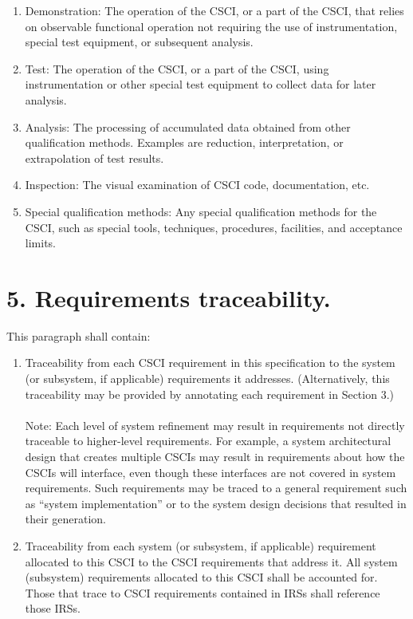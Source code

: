 \begin{enumerate}
\itemsep1pt\parskip0pt
\item
  Demonstration: The operation of the CSCI, or a part of the CSCI, that
  relies on observable functional operation not requiring the use of
  instrumentation, special test equipment, or subsequent analysis.
\item
  Test: The operation of the CSCI, or a part of the CSCI, using
  instrumentation or other special test equipment to collect data for
  later analysis.
\item
  Analysis: The processing of accumulated data obtained from other
  qualification methods. Examples are reduction, interpretation, or
  extrapolation of test results.
\item
  Inspection: The visual examination of CSCI code, documentation, etc.
\item
  Special qualification methods: Any special qualification methods for
  the CSCI, such as special tools, techniques, procedures, facilities,
  and acceptance limits.
\end{enumerate}

\section{5. Requirements traceability.}

This paragraph shall contain:

\begin{enumerate}
\itemsep1pt\parskip0pt
\item
  Traceability from each CSCI requirement in this specification to the
  system (or subsystem, if applicable) requirements it addresses.
  (Alternatively, this traceability may be provided by annotating each
  requirement in Section 3.) \\\\ Note: Each level of system refinement
  may result in requirements not directly traceable to higher-level
  requirements. For example, a system architectural design that creates
  multiple CSCIs may result in requirements about how the CSCIs will
  interface, even though these interfaces are not covered in system
  requirements. Such requirements may be traced to a general requirement
  such as ``system implementation'' or to the system design decisions
  that resulted in their generation.
\item
  Traceability from each system (or subsystem, if applicable)
  requirement allocated to this CSCI to the CSCI requirements that
  address it. All system (subsystem) requirements allocated to this CSCI
  shall be accounted for. Those that trace to CSCI requirements
  contained in IRSs shall reference those IRSs.
\end{enumerate}

